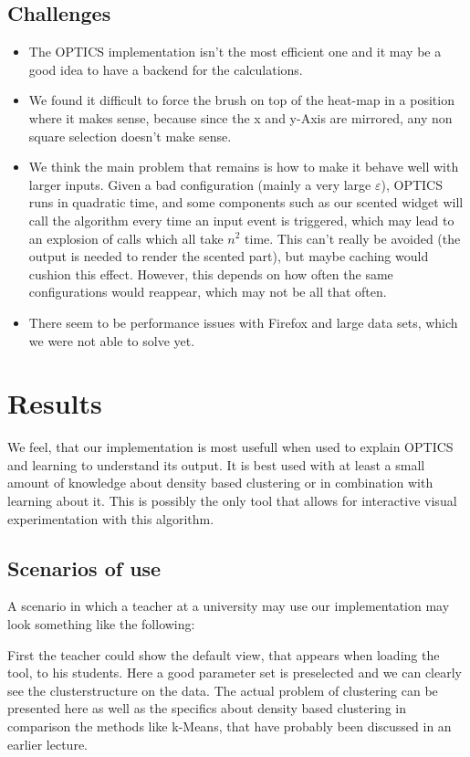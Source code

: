 \documentclass{vgtc}                          %
\begin{document}
\subsection{Challenges}
\begin{itemize}
\item The OPTICS implementation isn't the most efficient one and it may be a good idea to have a backend for the calculations.
\item We found it difficult to force the brush on top of the heat-map in a position where it makes sense, because since the x and y-Axis are mirrored, any non square selection doesn't make sense.
\item We think the main problem that remains is how to make it behave well with larger inputs. Given a bad configuration (mainly a very large  $\varepsilon$), OPTICS runs in quadratic time, and some components such as our scented widget will call the algorithm every time an input event is triggered, which may lead to an explosion of calls which all take $ n^{2} $ time. This can't really be avoided (the output is needed to render the scented part), but maybe caching would cushion this effect. However, this depends on how often the same configurations would reappear, which may not be all that often.
\item There seem to be performance issues with Firefox and large data sets, which we were not able to solve yet.
\end{itemize}


\section{Results}

We feel, that our implementation\cite{Our_Implementation} is most usefull when used to explain OPTICS and learning to understand its output. It is best used with at least a small amount of knowledge about density based clustering or in combination with learning about it. This is possibly the only tool that allows for interactive visual experimentation with this algorithm.

\subsection{Scenarios of use}

A scenario in which a teacher at a university may use our implementation may look something like the following:

First the teacher could show the default view, that appears when loading the tool, to his students. Here a good parameter set is preselected and we can clearly see the clusterstructure on the data. The actual problem of clustering can be presented here as well as the specifics about density based clustering in comparison the methods like k-Means, that have probably been discussed in an earlier lecture.
\end{document}
